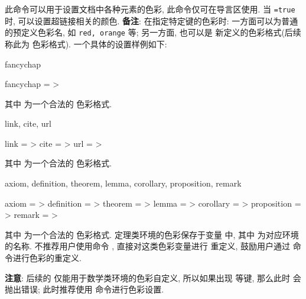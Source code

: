 \clearpage
\begin{function}[updated=2025-04-25]{\zcolorset}
  \begin{syntax}
  \end{syntax}
  此命令可以用于设置文档中各种元素的色彩, 此命令仅可在导言区使用. 当 \texttt{=true} 时, 可以设置超链接相关的颜色.
  \textbf{备注}: 在指定特定键的色彩时: 一方面可以为普通的预定义色彩名, 如 \texttt{red, orange} 等; 另一方面, 
  也可以是 \ztex{} 新定义的色彩格式(后续称此为 \ztex{} 色彩格式). 一个具体的设置样例如下: 
\end{function}
\begin{DocExample}
\end{DocExample}


\setlength{\dvalWidth}{4em}
\setlength{\dvalwidth}{3.75em}
\begin{keyval}[parent=ztex/color]{fancychap}
  \begin{syntax}
    fancychap = >
  \end{syntax}
  其中  为一个合法的 \ztex{} 色彩格式.
\end{keyval}


\begin{keyval}[parent=ztex/color]{link, cite, url}
  \begin{syntax}
    link = >
    cite = >
    url  = >
  \end{syntax}
  其中  为一个合法的 \ztex{} 色彩格式.
\end{keyval}


\begin{keyval}[parent=ztex/color]{axiom, definition, theorem, lemma, corollary, proposition, remark}
  \begin{syntax}
    axiom       = >
    definition  = >
    theorem     = >
    lemma       = >
    corollary   = >
    proposition = >
    remark      = >
  \end{syntax}
  其中  为一个合法的 \ztex{} 色彩格式. 定理类环境的色彩保存于变量  中, 
  其中  为对应环境的名称. 不推荐用户使用命令 \cmd{\definecolor},  直接对这类色彩变量进行
  重定义, \ztex{} 鼓励用户通过 \cmd{\zcolorset} 命令进行色彩的重定义.\par
  \textbf{注意}: 后续的 \cmd{\zthmcolorset} 仅能用于数学类环境的色彩自定义, 所以如果出现  等键,
  那么此时 \ztex{} 会抛出错误; 此时推荐使用 \cmd{\zcolorset} 命令进行色彩设置.
\end{keyval}


